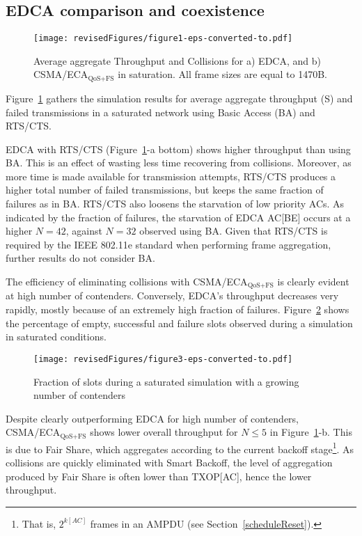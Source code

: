 \documentclass[a4paper]{article}
\begin{document}
\subsection{EDCA comparison and coexistence}

	\begin{figure}[t]
		\centering
			\texttt{[image: revisedFigures/figure1-eps-converted-to.pdf]}
			\caption{Average aggregate Throughput and Collisions for a) EDCA, and b) CSMA/ECA$_{\text{QoS+FS}}$ in saturation. All frame sizes are equal to 1470B.}
			\label{fig:multiplotSat}
	\end{figure}

Figure~\ref{fig:multiplotSat} gathers the simulation results for average aggregate throughput (S) and failed transmissions in a saturated network using Basic Access (BA) and RTS/CTS. 

EDCA with RTS/CTS (Figure~\ref{fig:multiplotSat}-a bottom) shows higher throughput than using BA. This is an effect of wasting less time recovering from collisions. Moreover, as more time is made available for transmission attempts, RTS/CTS produces a higher total number of failed transmissions, but keeps the same fraction of failures as in BA. RTS/CTS also loosens the starvation of low priority ACs. As indicated by the fraction of failures, the starvation of EDCA AC[BE] occurs at a higher $N=42$, against $N=32$ observed using BA. Given that RTS/CTS is required by the IEEE 802.11e standard when performing frame aggregation, further results do not consider BA.

The efficiency of eliminating collisions with CSMA/ECA$_\text{QoS+FS}$ is clearly evident at high number of contenders. Conversely, EDCA's throughput decreases very rapidly, mostly because of an extremely high fraction of failures. Figure~\ref{fig:slots} shows the percentage of empty, successful and failure slots observed during a simulation in saturated conditions.

 	\begin{figure}[t]
	\centering
		\texttt{[image: revisedFigures/figure3-eps-converted-to.pdf]}
		\caption{Fraction of slots during a saturated simulation with a growing number of contenders}
		\label{fig:slots}
	\end{figure}


Despite clearly outperforming EDCA for high number of contenders, CSMA/ECA$_\text{QoS+FS}$ shows lower overall throughput for $N\le5$ in Figure~\ref{fig:multiplotSat}-b. This is due to Fair Share, which aggregates according to the current backoff stage\footnote{That is, $2^{k[AC]}$ frames in an AMPDU (see Section~\ref{scheduleReset}).}. As collisions are quickly eliminated with Smart Backoff, the level of aggregation produced by Fair Share is often lower than TXOP[AC], hence the lower throughput.
\end{document}
